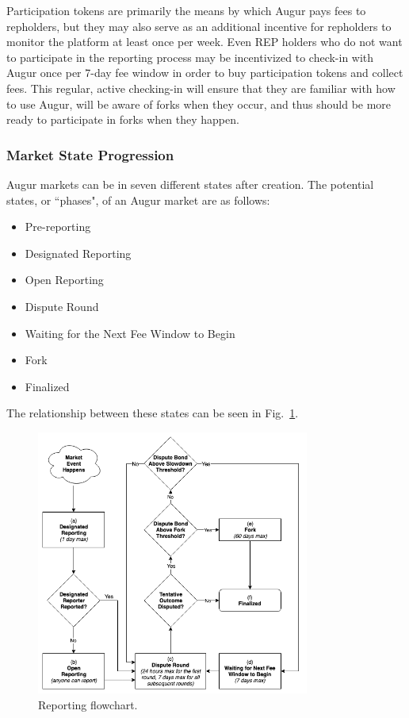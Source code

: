 \documentclass[floatfix,reprint,nofootinbib,amsmath,amssymb,epsfig,pre,floats,letterpaper,groupedaffiliation]{revtex4-1}
\theoremstyle{definition}
\theoremstyle{definition}
\begin{document}
Participation tokens are primarily the means by which Augur pays fees to repholders, but they may also serve as an additional incentive for repholders to monitor the platform at least once per week. Even REP holders who do not want to participate in the reporting process may be incentivized to check-in with Augur once per 7-day fee window in order to buy participation tokens and collect fees. This regular, active checking-in will ensure that they are familiar with how to use Augur, will be aware of forks when they occur, and thus should be more ready to participate in forks when they happen.

\subsubsection{Market State Progression}

Augur markets can be in seven different states after creation.  The potential states, or ``phases", of an Augur market are as follows:
\begin{itemize}
\item Pre-reporting
\item Designated Reporting
\item Open Reporting
\item Dispute Round
\item Waiting for the Next Fee Window to Begin
\item Fork
\item Finalized
\end{itemize}

The relationship between these states can be seen in Fig.~\ref{fig:reporting}.

\begin{figure}
\includegraphics[width=0.8\textwidth]{new_reporting.png}
\caption{Reporting flowchart.}
\label{fig:reporting}
\end{figure}
\end{document}
